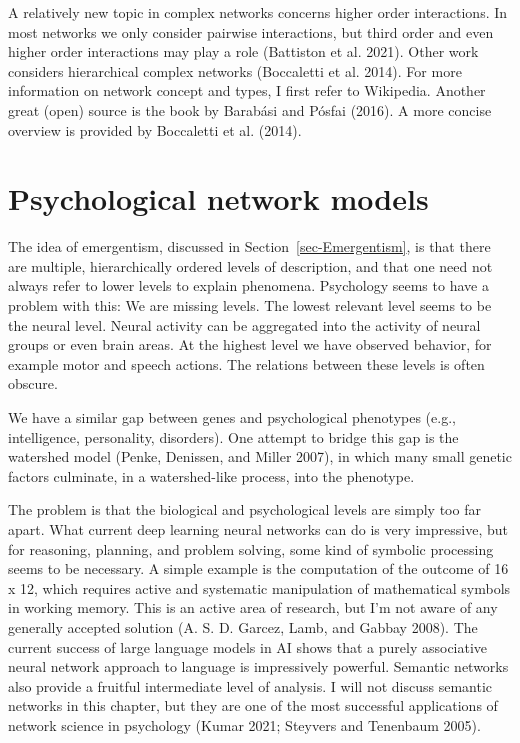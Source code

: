 \documentclass[
  a4paper,
  DIV=11,
  numbers=noendperiod,
  oneside]{scrreprt}
\begin{document}
A relatively new topic in complex networks concerns higher order
interactions. In most networks we only consider pairwise interactions,
but third order and even higher order interactions may play a role
(Battiston et al. 2021). Other work considers hierarchical complex
networks (Boccaletti et al. 2014). For more information on network
concept and types, I first refer to Wikipedia. Another great (open)
source is the book by Barabási and Pósfai (2016). A more concise
overview is provided by Boccaletti et al. (2014).

\hypertarget{sec-Psychological-network-models}{%
\section{Psychological network
models}\label{sec-Psychological-network-models}}

The idea of emergentism, discussed in Section~\ref{sec-Emergentism}, is
that there are multiple, hierarchically ordered levels of description,
and that one need not always refer to lower levels to explain phenomena.
Psychology seems to have a problem with this: We are missing levels. The
lowest relevant level seems to be the neural level. Neural activity can
be aggregated into the activity of neural groups or even brain areas. At
the highest level we have observed behavior, for example motor and
speech actions. The relations between these levels is often obscure.

We have a similar gap between genes and psychological phenotypes (e.g.,
intelligence, personality, disorders). One attempt to bridge this gap is
the watershed model (Penke, Denissen, and Miller 2007), in which many
small genetic factors culminate, in a watershed-like process, into the
phenotype.

The problem is that the biological and psychological levels are simply
too far apart. What current deep learning neural networks can do is very
impressive, but for reasoning, planning, and problem solving, some kind
of symbolic processing seems to be necessary. A simple example is the
computation of the outcome of 16 x 12, which requires active and
systematic manipulation of mathematical symbols in working memory. This
is an active area of research, but I'm not aware of any generally
accepted solution (A. S. D. Garcez, Lamb, and Gabbay 2008). The current
success of large language models in AI shows that a purely associative
neural network approach to language is impressively powerful. Semantic
networks also provide a fruitful intermediate level of analysis. I will
not discuss semantic networks in this chapter, but they are one of the
most successful applications of network science in psychology (Kumar
2021; Steyvers and Tenenbaum 2005).
\end{document}
